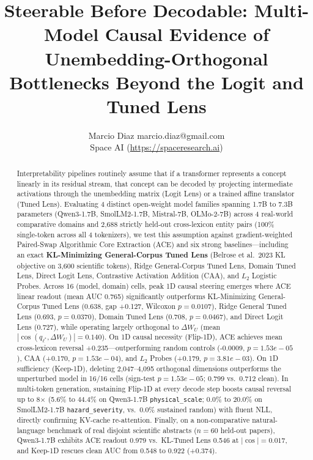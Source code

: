 \documentclass[10pt]{article}
\title{Steerable Before Decodable: Multi-Model Causal Evidence of Unembedding-Orthogonal Bottlenecks Beyond the Logit and Tuned Lens}
\author{\name Marcio Diaz \email marcio.diaz@gmail.com \\
\addr Space AI (\url{https://spaceresearch.ai})}
\begin{document}
\maketitle
\begin{abstract}
Interpretability pipelines routinely assume that if a transformer represents a concept linearly in its residual stream, that concept can be decoded by projecting intermediate activations through the unembedding matrix (Logit Lens) or a trained affine translator (Tuned Lens). Evaluating 4 distinct open-weight model families spanning 1.7B to 7.3B parameters (Qwen3-1.7B, SmolLM2-1.7B, Mistral-7B, OLMo-2-7B) across 4 real-world comparative domains and 2,688 strictly held-out cross-lexicon entity pairs (100\% single-token across all 4 tokenizers), we test this assumption against gradient-weighted Paired-Swap Algorithmic Core Extraction (ACE) and six strong baselines---including an exact \textbf{KL-Minimizing General-Corpus Tuned Lens} (Belrose et al.\ 2023 KL objective on 3,600 scientific tokens), Ridge General-Corpus Tuned Lens, Domain Tuned Lens, Direct Logit Lens, Contrastive Activation Addition (CAA), and $L_2$ Logistic Probes. Across 16 (model, domain) cells, peak 1D causal steering emerges where ACE linear readout (mean AUC 0.765) significantly outperforms KL-Minimizing General-Corpus Tuned Lens (0.638, gap +0.127, Wilcoxon $p=0.0107$), Ridge General Tuned Lens (0.693, $p=0.0370$), Domain Tuned Lens (0.708, $p=0.0467$), and Direct Logit Lens (0.727), while operating largely orthogonal to $\Delta W_U$ (mean $|\cos(q_{\ell^*}, \Delta W_U)| = 0.140$). On 1D causal necessity (Flip-1D), ACE achieves mean cross-lexicon reversal +0.235---outperforming random controls (-0.0009, $p=1.53e-05$), CAA (+0.170, $p=1.53e-04$), and $L_2$ Probes (+0.179, $p=3.81e-03$). On 1D sufficiency (Keep-1D), deleting 2,047--4,095 orthogonal dimensions outperforms the unperturbed model in 16/16 cells (sign-test $p=1.53e-05$; 0.799 vs.\ 0.712 clean). In multi-token generation, sustaining Flip-1D at every decode step boosts causal reversal up to 8$\times$ (5.6\% to 44.4\% on Qwen3-1.7B \texttt{physical\_scale}; 0.0\% to 20.0\% on SmolLM2-1.7B \texttt{hazard\_severity}, vs.\ 0.0\% sustained random) with fluent NLL, directly confirming KV-cache re-attention. Finally, on a non-comparative natural-language benchmark of real disjoint scientific abstracts ($n=60$ held-out papers), Qwen3-1.7B exhibits ACE readout 0.979 vs.\ KL-Tuned Lens 0.546 at $|\cos|=0.017$, and Keep-1D rescues clean AUC from 0.548 to 0.922 (+0.374).
\end{abstract}
\end{document}
